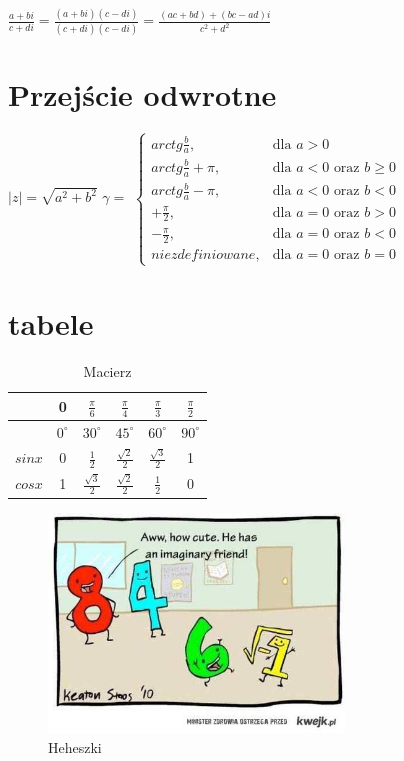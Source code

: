 \documentclass[a4paper,11pt]{article}
\begin{document}
$\frac{a + bi}{c + di} = \frac{(a + bi)(c - di)}{(c + di)(c - di)} = \frac{(ac + bd) + (bc - ad)i}{c^2 + d^2}$
\section{Przejście odwrotne}
$|z| = \sqrt{a^2 + b^2}$
\newline
$\gamma=$
$\begin{cases}
	arctg \frac{b}{a}, &\text{dla } a > 0\\
	arctg \frac{b}{a} + \pi, &\text{dla } a < 0 \text{ oraz } b \geq 0\\
	arctg \frac{b}{a} - \pi, &\text{dla } a < 0 \text{ oraz } b < 0\\
	+\frac{\pi}{2}, &\text{dla } a = 0 \text{ oraz } b > 0\\
	-\frac{\pi}{2}, &\text{dla } a = 0 \text{ oraz } b < 0\\
	niezdefiniowane, &\text{dla } a = 0 \text{ oraz } b = 0
\end{cases}$
\newpage
\section{tabele}
\begin{table}[htbp]
	\centering
		\begin{tabular}{|c|c|c|c|c|c|}
			\hline
			& 0 & $\frac{\pi}{6}$ & $\frac{\pi}{4}$ & $\frac{\pi}{3}$ & $\frac{\pi}{2}$ \\
			\hline
			& $0^\circ$ & $30^\circ$ & $45^\circ$ & $60^\circ$ & $90^\circ$ \\
			\hline
			$sin x$ & 0 & $\frac{1}{2}$ & $\frac{\sqrt{2}}{2}$ & $\frac{\sqrt{3}}{2}$ & 1 \\
			\hline
			$cos x$ & 1 & $\frac{\sqrt{3}}{2}$ & $\frac{\sqrt{2}}{2}$ & $\frac{1}{2}$ & 0 \\
			\hline
		\end{tabular}
	\caption{Macierz}
	\label{tab:Macierz}
\end{table}
\begin{figure}[htbp]
	\centering
		\includegraphics[width=0.70\textwidth]{licz.jpeg}
	\caption{Heheszki}
	\label{fig:licz}
\end{figure}
\end{document}
